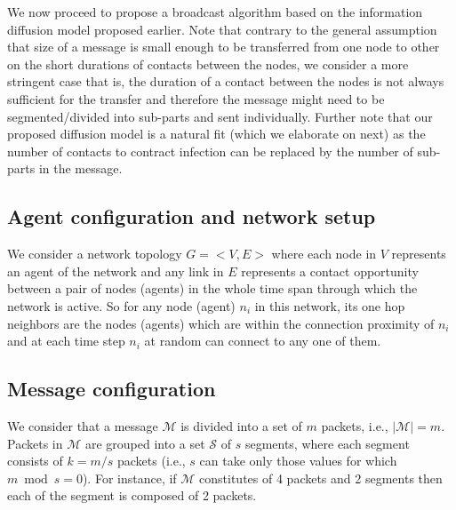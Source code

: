\noindent
We now proceed to propose a broadcast algorithm based on the information diffusion model proposed earlier. 
Note that contrary to the general assumption that size of a message is small enough to be transferred from one node to other 
on the short durations of contacts between the nodes, we consider a more stringent case that is, the duration of a contact 
between the nodes is not always sufficient for the transfer and therefore the message might need to be 
segmented/divided into sub-parts and sent individually. Further note that our proposed diffusion model is a natural fit (which we elaborate on next) as the 
number of contacts to contract infection can be replaced by the number of sub-parts in the message. 

\subsection{Agent configuration and network setup}
We consider a network topology $G = < V,E >$ where each node in $V$ represents an agent of the network and any link in $E$ represents a contact 
opportunity between a pair of nodes (agents) in the whole time span through which the network is active. So for any node (agent) $n_{i}$ in this network, its one hop 
neighbors are the nodes (agents) which are within the connection proximity of $n_{i}$ and at each time step $n_{i}$ at random can connect to any one of them. 


\subsection{Message configuration}
We consider that a message $\mathcal{M}$ is divided into a set of $m$ packets, i.e., $|\mathcal{M}| = m$. 
 Packets in $\mathcal{M}$ are grouped into a set $\mathcal{S}$ of $s$ segments, 
where each segment consists of $k = m/s$ packets (i.e., $s$ can take only those values for which $m \bmod s = 0$). 
For instance, if $\mathcal{M}$ constitutes of 4 packets and 2 segments then each of the segment is composed of 2 packets. 

